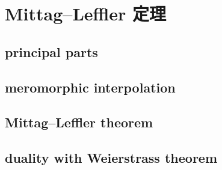 \section{Mittag–Leffler 定理}
\label{b3:sec:2004}


\subsection{principal parts}
\label{b3:subsec:200401}

\subsection{meromorphic interpolation}
\label{b3:subsec:200402}

\subsection{Mittag–Leffler theorem}
\label{b3:subsec:200403}

\subsection{duality with Weierstrass theorem}
\label{b3:subsec:200404}


